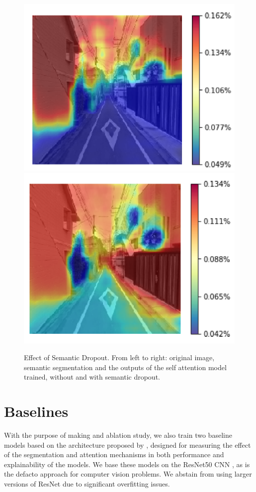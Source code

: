 \begin{figure}[!htb]
		\includegraphics[width=\linewidth]{figures/segrank_sample.png}
	\endminipage\hfill
		\includegraphics[width=\linewidth]{figures/segattn_sample.png}
	\endminipage
	\caption[Effect of Semantic Dropout]{
		Effect of Semantic Dropout. From left to right: original image, semantic segmentation
		and the outputs of the self attention model trained, without and with semantic dropout.
	}
	\label{fig:dropout}
\end{figure}

\section{Baselines}
\label{sec:baselines}
With the purpose of making and ablation study, we also train two baseline models
based on the architecture proposed by , designed for
measuring the effect of the segmentation and attention mechanisms in both performance
and explainability of the models. We base these models on the ResNet50 CNN \cite{he_resnet},
as is the defacto approach for computer vision problems. We abstain from using larger
versions of ResNet due to significant overfitting issues.


